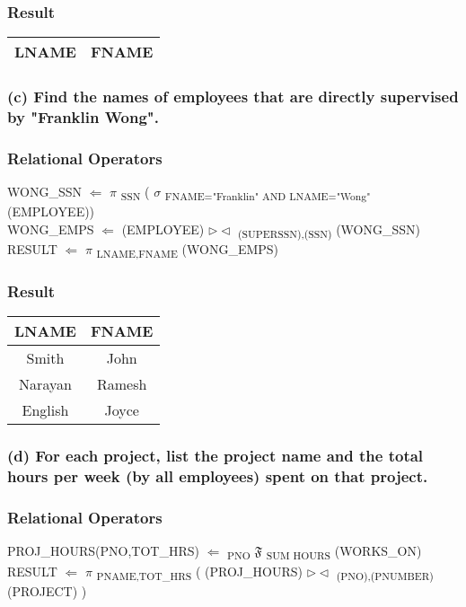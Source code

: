 \subsubsection*{Result}
\begin{center}
\begin{tabular}{ c | c }
  LNAME & FNAME \\ \hline
\end{tabular}
\end{center}

\subsubsection*{(c) Find the names of employees that are directly supervised by "Franklin Wong".}
\subsubsection*{Relational Operators}
WONG\_SSN $\Leftarrow$ $\pi$ \textsubscript{SSN} ( $\sigma$ \textsubscript{FNAME="Franklin" AND LNAME="Wong"} (EMPLOYEE))\\
WONG\_EMPS $\Leftarrow$ (EMPLOYEE) $\rhd\lhd$ \textsubscript{(SUPERSSN),(SSN)} (WONG\_SSN)\\
RESULT $\Leftarrow$ $\pi$ \textsubscript{LNAME,FNAME} (WONG\_EMPS)

\subsubsection*{Result}
\begin{center}
\begin{tabular}{ c | c }
  LNAME & FNAME \\ \hline
  Smith & John \\
  Narayan & Ramesh \\
  English & Joyce \\
\end{tabular}
\end{center}

\subsubsection*{(d) For each project, list the project name and the total hours per week (by all employees) spent on that project.}
\subsubsection*{Relational Operators}
PROJ\_HOURS(PNO,TOT\_HRS) $\Leftarrow$ \textsubscript{PNO} $\mathfrak{F}$ \textsubscript{SUM HOURS} (WORKS\_ON) \\
RESULT $\Leftarrow$ $\pi$ \textsubscript{PNAME,TOT\_HRS} ( (PROJ\_HOURS) $\rhd\lhd$ \textsubscript{(PNO),(PNUMBER)} (PROJECT) )

